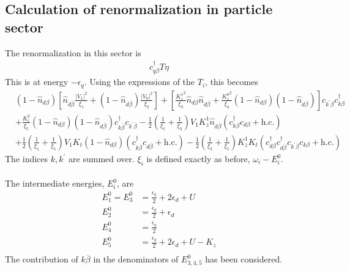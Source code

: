 \documentclass[twoside,11pt]{report}
\numberwithin{equation}{section}
\begin{document}
\subsection{Calculation of renormalization in particle sector}
The renormalization in this sector is
\begin{equation}\begin{aligned}
	c^\dagger_{q\beta} T \eta
\end{aligned}\end{equation}
This is at energy \(-\epsilon_q\).
Using the expressions of the \(T_i\), this becomes
\begin{equation}\begin{aligned}
	&\left(1 - \hat n_{d\beta}\right)\left[\hat n_{d\overline\beta}\frac{|V_1|^2}{\xi_1} + \left(1 - \hat n_{d\overline\beta}\right)\frac{|V_0|^2}{\xi_2}\right] + \left[\frac{{K_z^1}^2}{\xi_3}\hat n_{d\beta}\hat n_{d\overline\beta} + \frac{{K_z^0}^2}{\xi_4}\left(1 - \hat n_{d\beta}\right)\left(1 - \hat n_{d\overline\beta}\right)\right]c_{k^\prime\beta}c^\dagger_{k\beta} \\
	&+ \frac{K_t^2}{\xi_5}\left(1 - \hat n_{d\beta}\right)\left(1 - \hat n_{d\overline\beta}\right)c^\dagger_{k\overline\beta}c_{k^\prime\overline\beta} - \frac{1}{2}\left(\frac{1}{\xi_1} + \frac{1}{\xi_3} \right)V_1 K_z^1 \hat n_{d\overline\beta}\left(c^\dagger_{k\beta}c_{d\beta} + \text{h.c.}\right) \\
	&+ \frac{1}{2}\left(\frac{1}{\xi_1} + \frac{1}{\xi_5} \right)V_1 K_t \left(1 - \hat n_{d\beta}\right)\left(c^\dagger_{k\overline\beta}c_{d\overline\beta} + \text{h.c.}\right)- \frac{1}{2}\left(\frac{1}{\xi_3} + \frac{1}{\xi_5} \right)K_z^1 K_t \left(c^\dagger_{d\beta}c^\dagger_{d\overline\beta}c_{k^\prime\overline\beta}c_{k\beta} + \text{h.c.}\right)
\end{aligned}\end{equation}
The indices \(k,k^\prime\) are summed over.
\(\xi_i\) is defined exactly as before, \(\omega_i - E_i^0\).
\\\\The intermediate energies, \(E_i^0\), are
\begin{equation}\begin{aligned}
	E^0_1 = E_3^0 &= \frac{\epsilon_q}{2} + 2\epsilon_d + U\\
	E^0_2 &= \frac{\epsilon_q}{2} + \epsilon_d \\
	E^0_4 &= \frac{\epsilon_q}{2}\\
	E_5^0 &= \frac{\epsilon_q}{2} + 2\epsilon_d + U - K_z\\
\end{aligned}\end{equation}
The contribution of \(k\overline\beta\) in the denominators of \(E^0_{3,4,5}\) has been considered.
\end{document}
